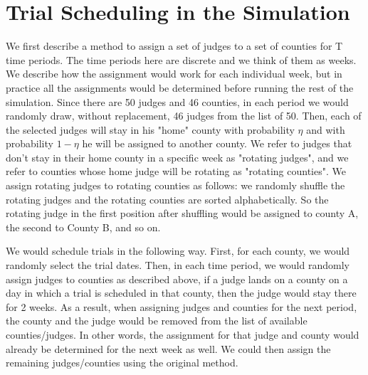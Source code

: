 \documentclass[11pt]{article}
\begin{document}
\section{Trial Scheduling in the Simulation}
  We first describe a method to assign a set of judges to a set of counties for T time periods. The time periods here are discrete and we think of them as weeks. We describe how the assignment would work for each individual week, but in practice all the assignments would be determined before running the rest of the simulation. Since there are 50 judges and 46 counties, in each period we would randomly draw, without replacement, 46 judges from the list of 50. Then, each of the selected judges will stay in his "home" county with probability $\eta$ and with probability $1-\eta$ he will be assigned to another county. We refer to judges that don't stay in their home county in a specific week as "rotating judges", and we refer to counties whose home judge will be rotating as "rotating counties". We assign rotating judges to rotating counties as follows: we randomly shuffle the rotating judges and the rotating counties are sorted alphabetically. So the rotating judge in the first position after shuffling would be assigned to county A, the second to County B, and so on.

  We would schedule trials in the following way. First, for each county, we would randomly select the trial dates. Then, in each time period, we would randomly assign judges to counties as described above, if a judge lands on a county on a day in which a trial is scheduled in that county, then the judge would stay there for 2 weeks. As a result, when assigning judges and counties for the next period, the county and the judge would be removed from the list of available counties/judges. In other words, the assignment for that judge and county would already be determined for the next week as well. We could then assign the remaining judges/counties using the original method.
\end{document}
